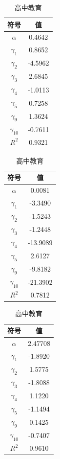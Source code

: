 \documentclass[UTF8, zihao=-4]{ctexart}
\begin{document}
	 \begin{table}[H]
	 	\begin{minipage}[b]{0.3\textwidth}
	 		\centering
	 		\begin{tabular}{@{}c c@{}}
	 			\toprule
	 			\textbf{符号} & \textbf{值} \\
	 			\midrule
	 			$\alpha$	 & 0.4642 \\
	 			$\gamma_1$ 	 & 0.8652 \\
	 			$\gamma_2$   & -4.5962 \\
	 			$\gamma_3$ 	 & 2.6845 \\
	 			$\gamma_4$   & -1.0113 \\
	 			$\gamma_5$   & 0.7258 \\
	 			$\gamma_9$   & 1.3624 \\
	 			$\gamma_{10}$   & -0.7611 \\
	 			$R^2$   & 0.9321 \\
	 			\bottomrule
	 		\end{tabular}
	 		\caption{义务教育}
	 	\end{minipage}
	 	\begin{minipage}[b]{0.3\textwidth}
	 		\centering
	 		\begin{tabular}{@{}c c@{}}
	 			\toprule
	 			\textbf{符号} & \textbf{值} \\
	 			\midrule
	 			$\alpha$	 & 0.0081 \\
	 			$\gamma_1$ 	 & -3.3490 \\
	 			$\gamma_2$   & -1.5243 \\
	 			$\gamma_3$ 	 & -1.2448 \\
	 			$\gamma_4$   & -13.9089 \\
	 			$\gamma_5$   & 2.6127 \\
	 			$\gamma_9$   & -9.8182 \\
	 			$\gamma_{10}$   & -21.3902 \\
	 			$R^2$   & 0.7812 \\
	 			\bottomrule
	 		\end{tabular}
	 		\caption{高中教育}
	 	\end{minipage}
	 	\begin{minipage}[b]{0.3\textwidth}
	 		\centering
	 		\begin{tabular}{@{}c c@{}}
	 			\toprule
	 			\textbf{符号} & \textbf{值} \\
	 			\midrule
	 			$\alpha$	 & 2.47708 \\
	 			$\gamma_1$ 	 & -1.8920 \\
	 			$\gamma_2$   & 1.5775 \\
	 			$\gamma_3$ 	 & -1.8088 \\
	 			$\gamma_4$   & 1.1220 \\
	 			$\gamma_5$   & -1.1494 \\
	 			$\gamma_9$   & 0.1425 \\
	 			$\gamma_{10}$   & -0.7407 \\
				$R^2$   & 0.9610 \\


\end{tabular}
\end{minipage}
\end{table}
\end{document}
